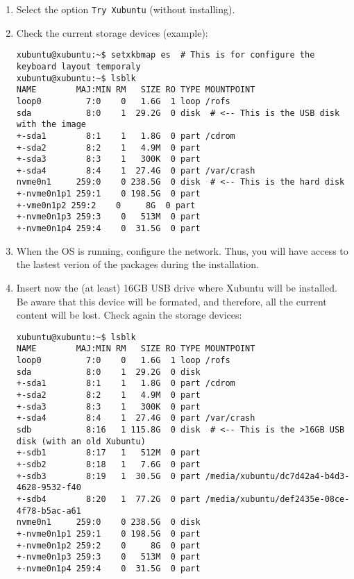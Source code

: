 \begin{enumerate}
\item Select the option \texttt{Try Xubuntu} (without installing).

\item Check the current storage devices (example):

\begin{verbatim}
xubuntu@xubuntu:~$ setxkbmap es  # This is for configure the keyboard layout temporaly
xubuntu@xubuntu:~$ lsblk
NAME        MAJ:MIN RM   SIZE RO TYPE MOUNTPOINT
loop0         7:0    0   1.6G  1 loop /rofs
sda           8:0    1  29.2G  0 disk  # <-- This is the USB disk with the image
+-sda1        8:1    1   1.8G  0 part /cdrom
+-sda2        8:2    1   4.9M  0 part
+-sda3        8:3    1   300K  0 part
+-sda4        8:4    1  27.4G  0 part /var/crash
nvme0n1     259:0    0 238.5G  0 disk  # <-- This is the hard disk
+-nvme0n1p1 259:1    0 198.5G  0 part
+-vme0n1p2 259:2    0     8G  0 part
+-nvme0n1p3 259:3    0   513M  0 part
+-nvme0n1p4 259:4    0  31.5G  0 part
\end{verbatim}
  
\item When the OS is running, configure the network. Thus, you will
  have access to the lastest verion of the packages during the
  installation.
  
\item Insert now the (at least) 16GB USB drive where Xubuntu will be
  installed. Be aware that this device will be formated, and
  therefore, all the current content will be lost. Check again the
  storage devices:

\begin{verbatim}
xubuntu@xubuntu:~$ lsblk
NAME        MAJ:MIN RM   SIZE RO TYPE MOUNTPOINT
loop0         7:0    0   1.6G  1 loop /rofs
sda           8:0    1  29.2G  0 disk
+-sda1        8:1    1   1.8G  0 part /cdrom
+-sda2        8:2    1   4.9M  0 part
+-sda3        8:3    1   300K  0 part
+-sda4        8:4    1  27.4G  0 part /var/crash
sdb           8:16   1 115.8G  0 disk  # <-- This is the >16GB USB disk (with an old Xubuntu)
+-sdb1        8:17   1   512M  0 part
+-sdb2        8:18   1   7.6G  0 part
+-sdb3        8:19   1  30.5G  0 part /media/xubuntu/dc7d42a4-b4d3-4628-9532-f40
+-sdb4        8:20   1  77.2G  0 part /media/xubuntu/def2435e-08ce-4f78-b5ac-a61
nvme0n1     259:0    0 238.5G  0 disk
+-nvme0n1p1 259:1    0 198.5G  0 part
+-nvme0n1p2 259:2    0     8G  0 part
+-nvme0n1p3 259:3    0   513M  0 part
+-nvme0n1p4 259:4    0  31.5G  0 part 
\end{verbatim}


\end{enumerate}
